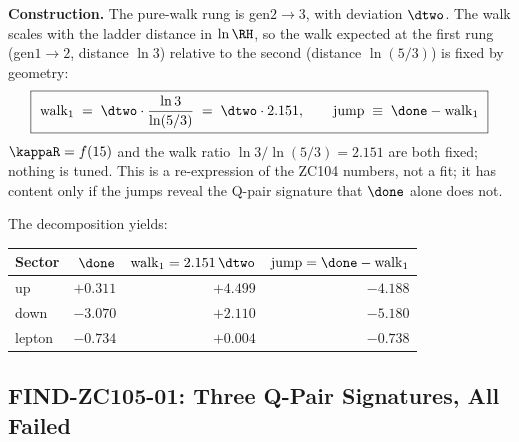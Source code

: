 \documentclass[12pt, a4paper]{article}
\begin{document}
\begin{formalbox}[title={DEF-ZC105-01: Walk/jump decomposition of the first rung
  (parameter-free)}]
\textbf{Construction.} The pure-walk rung is gen$2{\to}3$, with deviation
$\dtwo$. The walk scales with the ladder distance in $\ln\RH$, so the walk
expected at the first rung (gen$1{\to}2$, distance $\ln 3$) relative to the
second (distance $\ln(5/3)$) is fixed by geometry:
\begin{equation}
  \boxed{\ \mathrm{walk}_1 \;=\; \dtwo\cdot\frac{\ln 3}{\ln(5/3)}
   \;=\; \dtwo\cdot 2.151,\qquad
   \mathrm{jump} \;\equiv\; \done - \mathrm{walk}_1\ }
  \label{eq:decomp-zc105}
\end{equation}
$\kappaR=f(15)$ and the walk ratio $\ln3/\ln(5/3)=2.151$ are both fixed; nothing
is tuned. This is a re-expression of the ZC104 numbers, not a fit; it has content
only if the jumps reveal the Q-pair signature that $\done$ alone does not.
\end{formalbox}

The decomposition yields:
\begin{center}
{\small\renewcommand{\arraystretch}{1.25}
\begin{tabular}{@{}lrrr@{}}
\toprule
Sector & $\done$ & $\mathrm{walk}_1=2.151\,\dtwo$ & $\mathrm{jump}=\done-\mathrm{walk}_1$ \\
\midrule
up     & $+0.311$ & $+4.499$ & $-4.188$ \\
down   & $-3.070$ & $+2.110$ & $-5.180$ \\
lepton & $-0.734$ & $+0.004$ & $-0.738$ \\
\bottomrule
\end{tabular}}
\end{center}

\subsection{FIND-ZC105-01: Three Q-Pair Signatures, All Failed}
\label{sec:fails-zc105}

\end{document}
